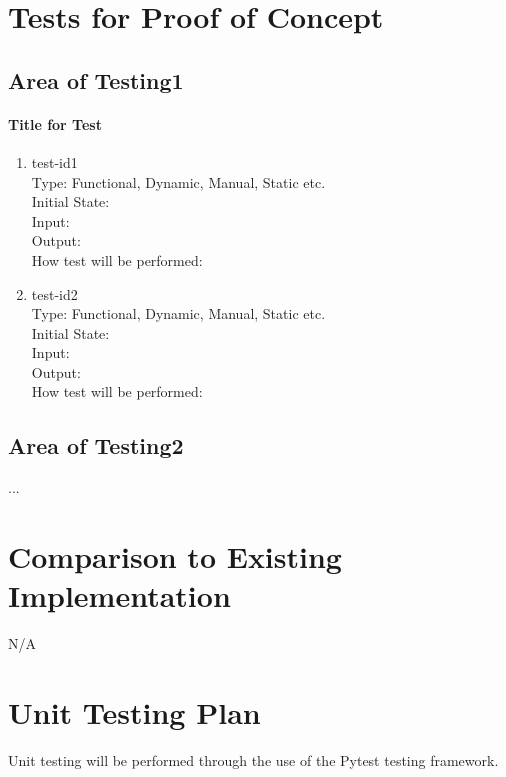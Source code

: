 \documentclass[12pt, titlepage]{article}
\begin{document}
\section{Tests for Proof of Concept}

\subsection{Area of Testing1}
        
\paragraph{Title for Test}

\begin{enumerate}

\item{test-id1}\\
Type: Functional, Dynamic, Manual, Static etc.\\
Initial State: \\
Input: \\
Output: \\
How test will be performed: \\

\item{test-id2}\\
Type: Functional, Dynamic, Manual, Static etc.\\
Initial State: \\
Input: \\
Output: \\
How test will be performed: 

\end{enumerate}

\subsection{Area of Testing2}

...

    
\section{Comparison to Existing Implementation}
N/A

\section{Unit Testing Plan}
Unit testing will be performed through the use of the Pytest testing framework.
\end{document}
